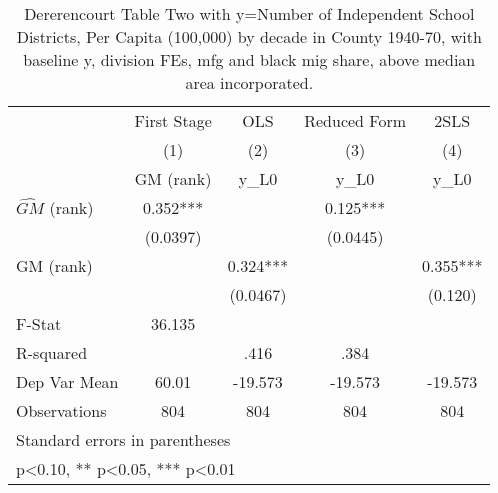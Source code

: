 \begin{table}[htbp]\centering
\def\sym#1{\ifmmode^{#1}\else\(^{#1}\)\fi}
\caption{Dererencourt Table Two with y=Number of Independent School Districts, Per Capita (100,000) by decade in County 1940-70, with baseline y, division FEs, mfg and black mig share, above median area incorporated.}
\begin{tabular}{l*{4}{c}}
\toprule
                    & First Stage   &         OLS   &Reduced Form   &        2SLS   \\
                    &\multicolumn{1}{c}{(1)}&\multicolumn{1}{c}{(2)}&\multicolumn{1}{c}{(3)}&\multicolumn{1}{c}{(4)}\\
                    &\multicolumn{1}{c}{GM  (rank)}&\multicolumn{1}{c}{y\_L0}&\multicolumn{1}{c}{y\_L0}&\multicolumn{1}{c}{y\_L0}\\
\midrule
$\hat{GM}$ (rank)   &       0.352***&               &       0.125***&               \\
                    &    (0.0397)   &               &    (0.0445)   &               \\
\addlinespace
GM  (rank)          &               &       0.324***&               &       0.355***\\
                    &               &    (0.0467)   &               &     (0.120)   \\
\midrule
F-Stat              &      36.135   &               &               &               \\
R-squared           &               &        .416   &        .384   &               \\
Dep Var Mean        &       60.01   &     -19.573   &     -19.573   &     -19.573   \\
Observations        &         804   &         804   &         804   &         804   \\
\bottomrule
\multicolumn{5}{l}{\footnotesize Standard errors in parentheses}\\
\multicolumn{5}{l}{\footnotesize * p<0.10, ** p<0.05, *** p<0.01}\\
\end{tabular}
\end{table}
